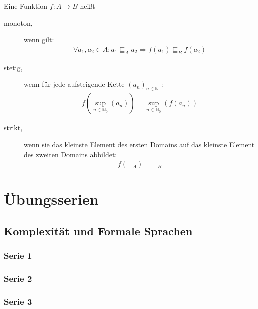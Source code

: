 \documentclass[
  a4paper,
  11pt,
]{scrartcl}
\newcommand{\N}{\mathbb{N}}
\begin{document}
\begin{itemize}
    Eine Funktion $f: A \rightarrow B$ heißt
    \begin{description}
      \item[monoton,] wenn gilt:
        \begin{align*}
          \forall a_1, a_2 \in A:
            a_1 \sqsubseteq_A a_2 \Rightarrow f(a_1) \sqsubseteq_B f(a_2)
        \end{align*}

      \item[stetig,] wenn für jede aufsteigende Kette ${(a_n)}_{n \in \N_0}$:
        \begin{align*}
          f \left( \sup\limits_{n \in \N_0} (a_n) \right)
          =
          \sup\limits_{n \in \N_0} \left( f (a_n) \right)
        \end{align*}

      \item[strikt,] wenn sie das kleinste Element des ersten Domains auf das
        kleinste Element des zweiten Domains abbildet:
        \begin{align*}
          f ( \bot_A ) = \bot_B
        \end{align*}
    \end{description}
\end{itemize}

\section{Übungsserien}

\subsection{Komplexität und Formale Sprachen}
\label{sub:komplexitat_und_formale_sprachen}

\subsubsection{Serie 1}
\label{sub:serie_1}




\subsubsection{Serie 2}
\label{sub:serie_2}




\subsubsection{Serie 3}
\label{sub:serie_3}
\end{document}
